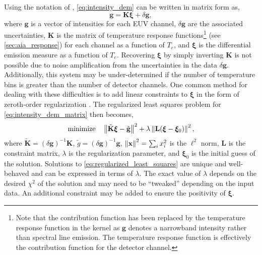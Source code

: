 Using the notation of \citet{hannah_differential_2012}, \autoref{eq:intensity_dem} can be written in matrix form as,
\begin{equation}\label{eq:intensity_dem_matrix}
    \mathbf{g} = \mathbf{K} \bm{\xi} + \delta\mathbf{g},
\end{equation}
where $\mathbf{g}$ is a vector of intensities for each EUV channel, $\delta\mathbf{g}$ are the associated uncertainties, $\mathbf{K}$ is the matrix 
of temperature response functions\footnote{Note that the contribution function has been replaced by the temperature response function in the kernel as $\mathbf{g}$ denotes a narrowband intensity rather than spectral line emission. The temperature response function is effectively the contribution function for the detector channel.} (see \autoref{sec:aia_response}) for each channel as a function of $T_e$, and $\bm{\xi}$ is the differential emission measure as a function of $T_e$. Recovering $\bm{\xi}$ by simply inverting $\mathbf{K}$ is not possible due to noise amplification from the uncertainties in the data $\delta\mathbf{g}$. Additionally, this system may be under-determined if the number of temperature bins is greater than the number of detector channels. One common method for dealing with these difficulties is to add linear constraints to $\bm{\xi}$ in the form of zeroth-order regularization \citep[e.g.][]{tikhonov_solution_1963}. The regularized least squares problem for \autoref{eq:intensity_dem_matrix} then becomes,
\begin{equation}\label{eq:regularized_least_squares}
    \textup{minimize} \quad \left\lVert\tilde{\mathbf{K}}\bm{\xi} - \tilde{\mathbf{g}}\right\rVert^2 + \lambda\left\lVert\mathbf{L}(\bm{\xi} - \bm{\xi}_0)\right\rVert^2,
\end{equation}
where $\tilde{\mathbf{K}}=(\delta\mathbf{g})^{-1}\mathbf{K}$, $\tilde{g}=(\delta\mathbf{g})^{-1}\mathbf{g}$, $\left\lVert\mathbf{x}\right\rVert^2=\sum_ix_i^2$ is the $\ell^2$ norm, $\mathbf{L}$ is the constraint matrix, $\lambda$ is the regularization parameter, and $\bm{\xi}_0$ is the initial guess of the solution. Solutions to \autoref{eq:regularized_least_squares} are unique and well-behaved and can be expressed in terms of $\lambda$. The exact value of $\lambda$ depends on the desired $\chi^2$ of the solution and may need to be ``tweaked'' depending on the input data. An additional constraint may be added to ensure the positivity of $\bm{\xi}$.

